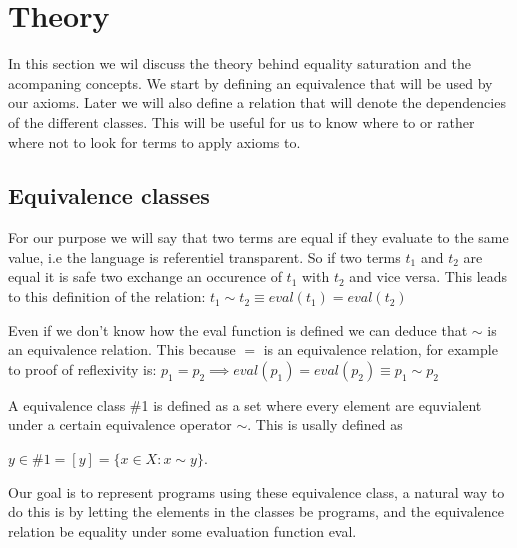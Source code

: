 

\newcommand{\defBNF}[4] {\text{#1}\quad&#2&::=&\;#3&\text{#4}}
\newcommand{\defaltBNF}[2] {&&|&\;#1&\text{#2}} 

\section{Theory}

In this section we wil discuss the theory behind equality saturation and the acompaning concepts. We
start by defining an equivalence that will be used by our axioms. Later we will also define a relation
that will denote the dependencies of the different classes. This will be useful for us to know where to
or rather where not to look for terms to apply axioms to.
\subsection{Equivalence classes}


For our purpose we will say that two terms are equal if they evaluate to the same value, i.e the language
is referentiel transparent. So if two terms $t_1$ and $t_2$ are equal it is safe two exchange an occurence
of $t_1$ with $t_2$ and vice versa. This leads to this definition of the relation:
$t_1 \sim t_2 \equiv eval(t_1) = eval(t_2)$


Even if we don't know how the eval function is defined we can deduce that $\sim$ is an equivalence relation.
This because $=$ is an equivalence relation, for example to proof of reflexivity is:
$p_1 = p_2 \implies eval(p_1) = eval(p_2) \equiv p_1 \sim p_2$







A equivalence class \#1 is defined as a set where every element are equvialent under a certain equivalence operator $\sim$. This is usally defined as 

$y \in\#1 = [y] = \{x \in X : x \sim y\}$.

Our goal is to represent programs using these equivalence class, a natural way to do this is by letting the elements in the classes be programs, and the equivalence relation be equality under some evaluation function eval.

